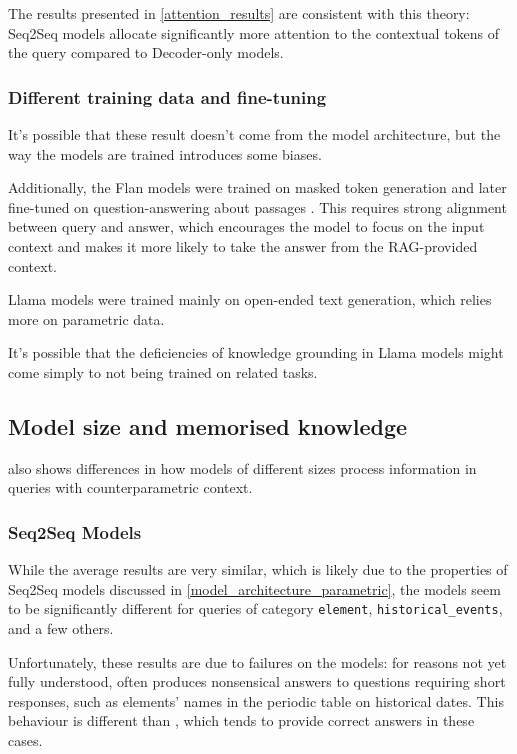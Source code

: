 The results presented in \cref{attention_results} are consistent with this theory: Seq2Seq models allocate significantly more attention to the contextual tokens of the query compared to Decoder-only models.

\subsubsection{Different training data and fine-tuning}

It's possible that these result doesn't come from the model architecture, but the way the models are trained introduces some biases.

Additionally, the Flan models were trained on masked token generation and later fine-tuned on question-answering about passages \citep{flant5}.
This requires strong alignment between query and answer, which encourages the model to focus on the input context and makes it more likely to take the answer from the RAG-provided context.

Llama models were trained mainly on open-ended text generation, which relies more on parametric data.

It's possible that the deficiencies of knowledge grounding in Llama models might come simply to not being trained on related tasks.

\subsection{Model size and memorised knowledge}
\label{model_size_parametric}

 also shows differences in how models of different sizes process information in queries with counterparametric context.

\subsubsection{Seq2Seq Models}

While the average results are very similar, which is likely due to the properties of Seq2Seq models discussed in \cref{model_architecture_parametric}, the models seem to be significantly different for queries of category \texttt{element}, \texttt{historical\_events}, and a few others.

Unfortunately, these results are due to failures on the models: for reasons not yet fully understood, \smallflan{} often produces nonsensical answers to questions requiring short responses, such as elements' names in the periodic table on historical dates.
This behaviour is different than \bigflan{}, which tends to provide correct answers in these cases.

